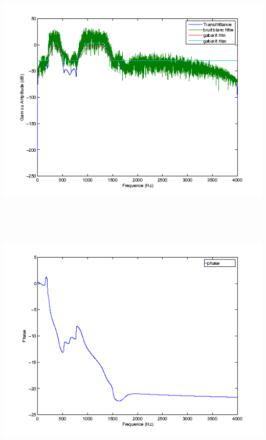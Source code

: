\documentclass{article}
\begin{document}
\inputminted[linenos,lastline=25]{matlab}{RII_Cheby2.m}
\includegraphics[height=13cm]{cheb2_1}
\inputminted[linenos,firstnumber=29,firstline=29,lastline=29]{matlab}{RII_Cheby2.m}
\includegraphics[height=10cm]{cheb2_2}
\inputminted[linenos,firstnumber=34,firstline=34,lastline=42]{matlab}{RII_Cheby2.m}
\end{document}
